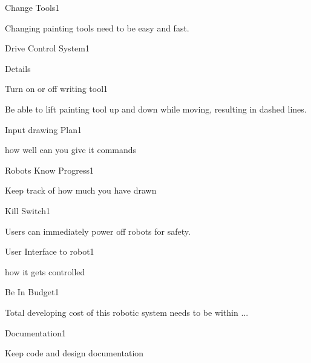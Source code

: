 \begin{functional_requirement}{Change Tools}{1}
\item Changing painting tools need to be easy and fast. 
\end{functional_requirement}

\begin{functional_requirement}{Drive Control System}{1}
\item Details
\end{functional_requirement}

\begin{functional_requirement}{Turn on or off writing tool}{1}
\item Be able to lift painting tool up and down while moving, resulting in dashed lines. 
\end{functional_requirement}

\begin{functional_requirement}{Input drawing Plan}{1}
\item how well can you give it commands
\end{functional_requirement}

\begin{functional_requirement}{Robots Know Progress}{1}
\item Keep track of how much you have drawn
\end{functional_requirement}

\begin{functional_requirement}{Kill Switch}{1}
\item Users can immediately power off robots for safety.
\end{functional_requirement}

\begin{functional_requirement}{User Interface to robot}{1}
\item how it gets controlled
\end{functional_requirement}

\begin{functional_requirement}{Be In Budget}{1}
\item Total developing cost of this robotic system needs to be within ...
\end{functional_requirement}

\begin{functional_requirement}{Documentation}{1}
\item Keep code and design documentation
\end{functional_requirement}


